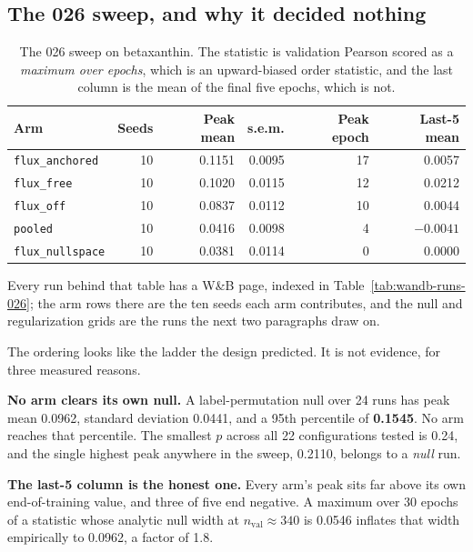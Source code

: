\subsection{The 026 sweep, and why it decided nothing}

\begin{table}[H]
  \centering
  \footnotesize
  \caption[026 arm results]{The 026 sweep on betaxanthin. The statistic is validation
  Pearson scored as a \emph{maximum over epochs}, which is an upward-biased order
  statistic, and the last column is the mean of the final five epochs, which is not.}
  \label{tab:026}
  \begin{tabular}{@{}lrrrrr@{}}
    \hline
    Arm & Seeds & Peak mean & s.e.m. & Peak epoch & Last-5 mean \\
    \hline
    \texttt{flux\_anchored} & 10 & 0.1151 & 0.0095 & 17 & 0.0057 \\
    \texttt{flux\_free} & 10 & 0.1020 & 0.0115 & 12 & 0.0212 \\
    \texttt{flux\_off} & 10 & 0.0837 & 0.0112 & 10 & 0.0044 \\
    \texttt{pooled} & 10 & 0.0416 & 0.0098 & 4 & $-0.0041$ \\
    \texttt{flux\_nullspace} & 10 & 0.0381 & 0.0114 & 0 & 0.0000 \\
    \hline
  \end{tabular}
\end{table}

Every run behind that table has a W\&B page, indexed in Table~\ref{tab:wandb-runs-026};
the arm rows there are the ten seeds each arm contributes, and the null and regularization
grids are the runs the next two paragraphs draw on.



The ordering looks like the ladder the design predicted. It is not evidence, for three
measured reasons.

\textbf{No arm clears its own null.} A label-permutation null over 24 runs has peak mean
0.0962, standard deviation 0.0441, and a 95th percentile of \textbf{0.1545}. No arm reaches
that percentile. The smallest $p$ across all 22 configurations tested is 0.24, and the
single highest peak anywhere in the sweep, 0.2110, belongs to a \emph{null} run.

\textbf{The last-5 column is the honest one.} Every arm's peak sits far above its own
end-of-training value, and three of five end negative. A maximum over 30 epochs of a
statistic whose analytic null width at $n_{\mathrm{val}} \approx 340$ is 0.0546 inflates
that width empirically to 0.0962, a factor of 1.8.

